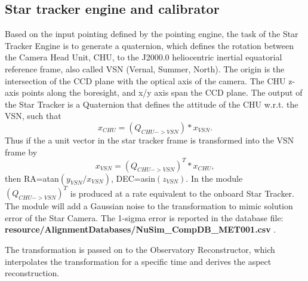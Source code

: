 \subsection{Star tracker engine and calibrator}
Based on the input pointing defined by the pointing engine, the task of the Star Tracker Engine is to generate a quaternion, which defines the rotation between the Camera Head Unit, CHU, to the J2000.0 heliocentric inertial equatorial reference frame, also called VSN (Vernal, Summer, North). The origin is the intersection of the CCD plane with the optical axis of the camera. The CHU z-axis points along the boresight, and x/y axis span the CCD plane.
The output of the Star Tracker is a Quaternion that defines the attitude of the CHU w.r.t. the VSN, such that
\begin{equation} 
x_{CHU}=(Q_{CHU->VSN}) * x_{VSN}. 
\end{equation}
Thus if the a unit vector in the star tracker frame is transformed into the VSN frame by 
\begin{equation}
x_{VSN}=(Q_{CHU->VSN} )^T* x_{CHU}, 
\end{equation}
then RA=atan$(y_{VSN}/x_{VSN})$, DEC=asin$(z_{VSN})$. In the module $(Q_{CHU->VSN})^T$ is produced at a rate equivalent to the onboard Star Tracker. The module will add a Gaussian noise to the transformation to mimic solution error of the Star Camera. The 1-sigma error is reported in the database file:\\ \textbf{resource/AlignmentDatabases/NuSim\_CompDB\_MET001.csv} .

 The transformation is passed on to the Observatory Reconstructor, which interpolates the transformation for a specific time and derives the aspect reconstruction.

